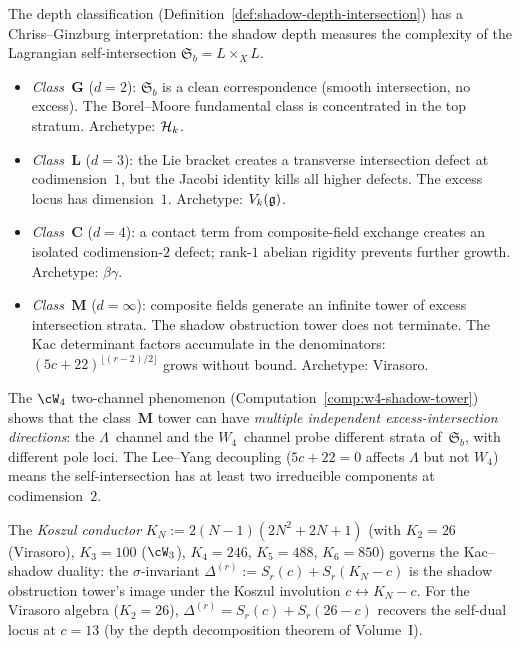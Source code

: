\begin{remark}%
\label{rem:cg-atlas}%
%
%
The depth classification
(Definition~\ref{def:shadow-depth-intersection}) has a
Chriss--Ginzburg interpretation: the shadow depth measures
the complexity of the Lagrangian self-intersection
$\mathfrak{S}_b = L\times_X L$.
\begin{itemize}[nosep]
\item \emph{Class~$\mathbf{G}$} ($d=2$): $\mathfrak{S}_b$ is
 a clean correspondence (smooth intersection, no excess).
 The Borel--Moore fundamental class is concentrated in the
 top stratum. Archetype: $\mathcal{H}_k$.
\item \emph{Class~$\mathbf{L}$} ($d=3$): the Lie bracket
 creates a transverse intersection defect at codimension~$1$,
 but the Jacobi identity kills all higher defects. The
 excess locus has dimension~$1$. Archetype: $V_k(\mathfrak{g})$.
\item \emph{Class~$\mathbf{C}$} ($d=4$): a contact term
 from composite-field exchange creates an isolated
 codimension-$2$ defect; rank-$1$ abelian rigidity
 prevents further growth. Archetype: $\beta\gamma$.
\item \emph{Class~$\mathbf{M}$} ($d=\infty$): composite
 fields generate an infinite tower of excess intersection
 strata. The shadow obstruction tower does not terminate. The Kac
 determinant factors accumulate in the denominators:
 $(5c+22)^{\lfloor(r-2)/2\rfloor}$ grows without bound.
 Archetype: Virasoro.
\end{itemize}
The $\cW_4$ two-channel phenomenon
(Computation~\ref{comp:w4-shadow-tower}) shows that the
class~$\mathbf{M}$ tower can have \emph{multiple independent
excess-intersection directions}: the $\Lambda$~channel and the
$W_4$~channel probe different strata of~$\mathfrak{S}_b$, with
different pole loci. The Lee--Yang decoupling
($5c+22 = 0$ affects $\Lambda$ but not $W_4$) means the
self-intersection has at least two irreducible components
at codimension~$2$.
\end{remark}

\begin{remark}%
\label{rem:koszul-conductor}%
%
%
The \emph{Koszul conductor}
$K_N := 2(N{-}1)(2N^2+2N+1)$ (with $K_2 = 26$ (Virasoro),
$K_3 = 100$ ($\cW_3$), $K_4 = 246$, $K_5 = 488$,
$K_6 = 850$) governs the Kac--shadow duality: the
$\sigma$-invariant
$\Delta^{(r)} := S_r(c) + S_r(K_N - c)$
is the shadow obstruction tower's image under the Koszul involution
$c \leftrightarrow K_N - c$.
For the Virasoro algebra ($K_2 = 26$),
$\Delta^{(r)} = S_r(c) + S_r(26 - c)$ recovers the
self-dual locus at $c = 13$
(by the depth decomposition theorem of Volume~I).
\end{remark}

